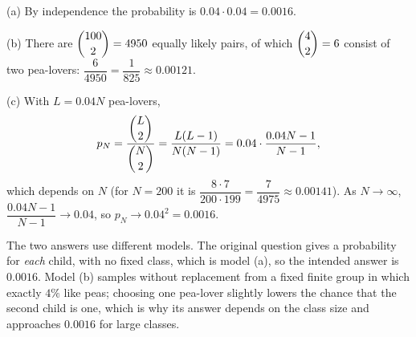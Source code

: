 (a) By independence the probability is $0.04\cdot0.04=\boxed{0.0016}$.

(b) There are $\dbinom{100}{2}=4950$ equally likely pairs, of which $\dbinom42=6$ consist of two pea-lovers: $\dfrac{6}{4950}=\boxed{\dfrac{1}{825}}\approx0.00121$.

(c) With $L=0.04N$ pea-lovers,
\[
p_N=\dfrac{\dbinom L2}{\dbinom N2}=\dfrac{L(L-1)}{N(N-1)}=0.04\cdot\dfrac{0.04N-1}{N-1},
\]
which depends on $N$ (for $N=200$ it is $\dfrac{8\cdot7}{200\cdot199}=\dfrac{7}{4975}\approx0.00141$). As $N\to\infty$, $\dfrac{0.04N-1}{N-1}\to0.04$, so $p_N\to0.04^2=0.0016$.

The two answers use different models. The original question gives a probability for \emph{each} child, with no fixed class, which is model (a), so the intended answer is $0.0016$. Model (b) samples without replacement from a fixed finite group in which exactly $4\%$ like peas; choosing one pea-lover slightly lowers the chance that the second child is one, which is why its answer depends on the class size and approaches $0.0016$ for large classes.
